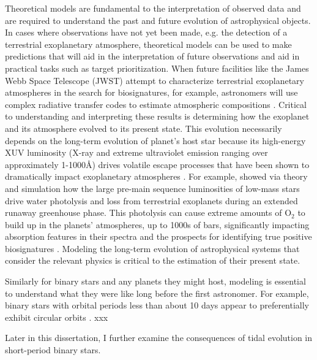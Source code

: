 Theoretical models are fundamental to the interpretation of observed data and are required to understand the past and future evolution of astrophysical objects.  In cases where observations have not yet been made, e.g. the detection of a terrestrial exoplanetary atmosphere, theoretical models can be used to make predictions that will aid in the interpretation of future observations and aid in practical tasks such as target prioritization.  When future facilities like the James Webb Space Telescope (JWST) attempt to characterize terrestrial exoplanetary atmospheres in the search for biosignatures, for example, astronomers will use complex radiative transfer codes to estimate atmospheric compositions \citep[e.g. SMART;][]{Meadows1996,Crisp1997}. Critical to understanding and interpreting these results is determining how the exoplanet and its atmosphere evolved to its present state. This evolution necessarily depends on the long-term evolution of planet's host star because its high-energy XUV luminosity (X-ray and extreme ultraviolet emission ranging over approximately 1-1000\AA) drives volatile escape processes that have been shown to dramatically impact exoplanetary atmospheres \citep{Watson1981,Lammer2003,MurrayClay2009}. For example, \citet{Luger2015} showed via theory and simulation how the large pre-main sequence luminosities of low-mass stars drive water photolysis and loss from terrestrial exoplanets during an extended runaway greenhouse phase. This photolysis can cause extreme amounts of O$_2$ to build up in the planets' atmospheres, up to 1000s of bars, significantly impacting absorption features in their spectra and the prospects for identifying true positive biosignatures \citep[see][]{Meadows2017,Meadows2018}. Modeling the long-term evolution of astrophysical systems that consider the relevant physics is critical to the estimation of their present state.

Similarly for binary stars and any planets they might host, modeling is essential to understand what they were like long before the first astronomer. For example, binary stars with orbital periods less than about 10 days appear to preferentially exhibit circular orbits \citep[see][for a relatively recent observational study of this phenomenon]{Meibom2005}. 
xxx

Later in this dissertation, I further examine the consequences of tidal evolution in short-period binary stars.


